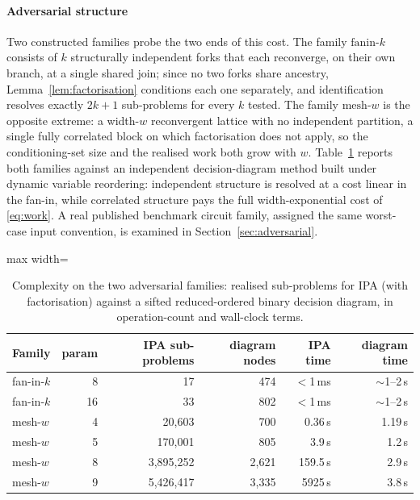 \documentclass[preprint,12pt]{elsarticle}
\begin{document}
\paragraph{Adversarial structure} Two constructed families probe the two ends of this cost. The family $\mathrm{fanin}\text{-}k$ consists of $k$ structurally independent forks that each reconverge, on their own branch, at a single shared join; since no two forks share ancestry, Lemma~\ref{lem:factorisation} conditions each one separately, and identification resolves exactly $2k{+}1$ sub-problems for every $k$ tested. The family $\mathrm{mesh}\text{-}w$ is the opposite extreme: a width-$w$ reconvergent lattice with no independent partition, a single fully correlated block on which factorisation does not apply, so the conditioning-set size and the realised work both grow with $w$. Table~\ref{tab:adversarial} reports both families against an independent decision-diagram method built under dynamic variable reordering: independent structure is resolved at a cost linear in the fan-in, while correlated structure pays the full width-exponential cost of \eqref{eq:work}. A real published benchmark circuit family, assigned the same worst-case input convention, is examined in Section~\ref{sec:adversarial}.

\begin{table}[ht]
\centering\small
\caption{Complexity on the two adversarial families: realised sub-problems for IPA (with factorisation) against a sifted reduced-ordered binary decision diagram, in operation-count and wall-clock terms.}
\label{tab:adversarial}
\begin{adjustbox}{max width=\linewidth}
\begin{tabular}{lrrrrr}
\toprule
Family & param & IPA sub-problems & diagram nodes & IPA time & diagram time\\
\midrule
fan-in-$k$ & 8  & 17 & 474 & $<$1\,ms & $\sim$1--2\,s\\
fan-in-$k$ & 16 & 33 & 802 & $<$1\,ms & $\sim$1--2\,s\\
mesh-$w$   & 4  & 20{,}603 & 700 & 0.36\,s & 1.19\,s\\
mesh-$w$   & 5  & 170{,}001 & 805 & 3.9\,s & 1.2\,s\\
mesh-$w$   & 8  & 3{,}895{,}252 & 2{,}621 & 159.5\,s & 2.9\,s\\
mesh-$w$   & 9  & 5{,}426{,}417 & 3{,}335 & 5925\,s & 3.8\,s\\
\bottomrule
\end{tabular}
\end{adjustbox}
\end{table}
\end{document}
